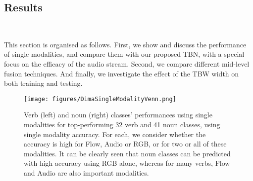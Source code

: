 \documentclass[10pt,twocolumn,letterpaper]{article}
\begin{document}
\subsection{Results}~\label{sec:results}
\vspace*{-12pt}

This section is organised as follows. First, we show and discuss the performance of single modalities,
and compare them with our proposed TBN, with a special focus on the efficacy of the audio stream. 
Second, we compare different mid-level fusion techniques.
And finally, we investigate the effect of the TBW width on both training and testing.

\begin{figure}[t]
\texttt{[image: figures/DimaSingleModalityVenn.png]}
\caption{Verb (left) and noun (right) classes' performances using single modalities for top-performing 32 verb and 41 noun classes, using single modality accuracy. For each, we consider whether the accuracy is high for Flow, Audio or RGB, or for two or all of these modalities. It can be clearly seen that noun classes can be predicted with high accuracy using RGB alone, whereas for many verbs, Flow and Audio are also important modalities. }
\label{fig:venn}
\end{figure}
\end{document}
